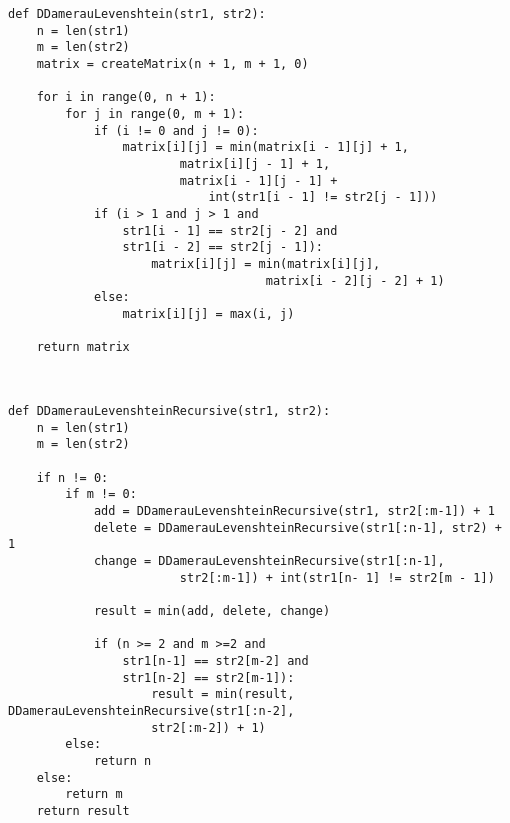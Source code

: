 \begin{center}
    \captionsetup{justification=raggedright,singlelinecheck=off}
    \begin{lstlisting}[label=lst:DamLev,caption=Итерационный алгоритм поиска расстояния Дамерау~---~Левенштейна]
def DDamerauLevenshtein(str1, str2):
	n = len(str1)
	m = len(str2)
	matrix = createMatrix(n + 1, m + 1, 0)
	
	for i in range(0, n + 1):
		for j in range(0, m + 1):
			if (i != 0 and j != 0):
				matrix[i][j] = min(matrix[i - 1][j] + 1,
						matrix[i][j - 1] + 1,
						matrix[i - 1][j - 1] + 
							int(str1[i - 1] != str2[j - 1]))
			if (i > 1 and j > 1 and
				str1[i - 1] == str2[j - 2] and
				str1[i - 2] == str2[j - 1]):
					matrix[i][j] = min(matrix[i][j], 
									matrix[i - 2][j - 2] + 1)
			else:
				matrix[i][j] = max(i, j)
		
	return matrix

	
\end{lstlisting}
\end{center}


\begin{center}
    \captionsetup{justification=raggedright,singlelinecheck=off}
    \begin{lstlisting}[label=lst:recDamLev,caption=Рекурсивный алгоритм поиска расстояния Дамерау~---~Левенштейна]
def DDamerauLevenshteinRecursive(str1, str2):
	n = len(str1)
	m = len(str2)
	
	if n != 0:
		if m != 0:
			add = DDamerauLevenshteinRecursive(str1, str2[:m-1]) + 1
			delete = DDamerauLevenshteinRecursive(str1[:n-1], str2) + 1
			change = DDamerauLevenshteinRecursive(str1[:n-1], 
						str2[:m-1]) + int(str1[n- 1] != str2[m - 1])
			
			result = min(add, delete, change)
			
			if (n >= 2 and m >=2 and 
				str1[n-1] == str2[m-2] and
				str1[n-2] == str2[m-1]):
					result = min(result, DDamerauLevenshteinRecursive(str1[:n-2], 
					str2[:m-2]) + 1)
		else:
			return n 
	else:
		return m 
	return result
	
\end{lstlisting}
\end{center}



